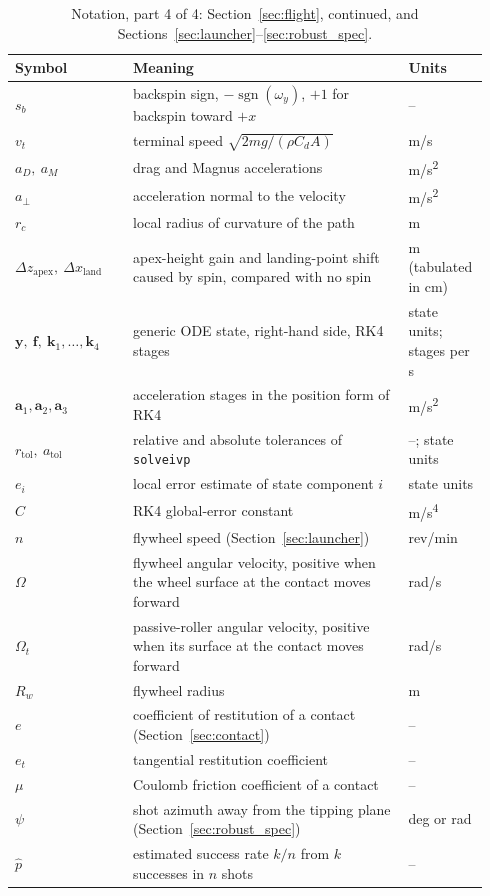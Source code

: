 \documentclass[11pt]{article}
\newcommand{\vect}[1]{\bm{#1}}
\DeclareRobustCommand{\code}[1]{{\def\_{\textunderscore\allowbreak}\texttt{#1}}}
\begin{document}
\begin{table}[p]
\centering
\small
\caption{Notation, part 4 of 4: Section~\ref{sec:flight}, continued, and Sections~\ref{sec:launcher}--\ref{sec:robust_spec}.}
\label{tab:notation-4}
\begin{tabular}{@{}p{0.24\linewidth}p{0.56\linewidth}p{0.14\linewidth}@{}}
  \toprule
  Symbol & Meaning & Units \\
  \midrule
  $s_b$ & backspin sign, $-\operatorname{sgn}(\omega_y)$, $+1$ for backspin toward $+x$ & -- \\
  $v_t$ & terminal speed $\sqrt{2mg/(\rho C_d A)}$ & m/s \\
  $a_D,\ a_M$ & drag and Magnus accelerations & m/s\textsuperscript{2} \\
  $a_\perp$ & acceleration normal to the velocity & m/s\textsuperscript{2} \\
  $r_c$ & local radius of curvature of the path & m \\
  $\Delta z_{\mathrm{apex}},\ \Delta x_{\mathrm{land}}$ & apex-height gain and landing-point shift caused by spin, compared with no spin & m (tabulated in cm) \\
  $\vect{y},\ \vect{f},\ \vect{k}_1,\dots,\vect{k}_4$ & generic ODE state, right-hand side, RK4 stages & state units; stages per s \\
  $\vect{a}_1,\vect{a}_2,\vect{a}_3$ & acceleration stages in the position form of RK4 & m/s\textsuperscript{2} \\
  $r_{\mathrm{tol}},\ a_{\mathrm{tol}}$ & relative and absolute tolerances of \code{solve\_ivp} & --; state units \\
  $e_i$ & local error estimate of state component $i$ & state units \\
  $C$ & RK4 global-error constant & m/s\textsuperscript{4} \\
  \midrule
  $n$ & flywheel speed (Section~\ref{sec:launcher}) & rev/min \\
  $\Omega$ & flywheel angular velocity, positive when the wheel surface at the contact moves forward & rad/s \\
  $\Omega_t$ & passive-roller angular velocity, positive when its surface at the contact moves forward & rad/s \\
  $R_w$ & flywheel radius & m \\
  $e$ & coefficient of restitution of a contact (Section~\ref{sec:contact}) & -- \\
  $e_t$ & tangential restitution coefficient & -- \\
  $\mu$ & Coulomb friction coefficient of a contact & -- \\
  $\psi$ & shot azimuth away from the tipping plane (Section~\ref{sec:robust_spec}) & deg or rad \\
  $\hat p$ & estimated success rate $k/n$ from $k$ successes in $n$ shots & -- \\
  \bottomrule
\end{tabular}
\end{table}
\end{document}
